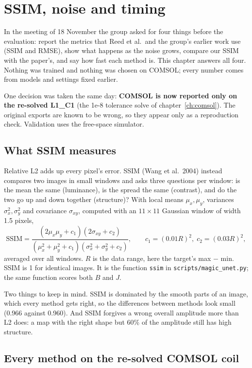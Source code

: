 \chapter{SSIM, noise and timing}\label{ch:noise}

In the meeting of 18 November the group asked for four things before the evaluation: report the metrics that Reed et
al.\ and the group's earlier work use (SSIM and RMSE), show what happens as the noise grows, compare our SSIM with
the paper's, and say how fast each method is. This chapter answers all four. Nothing was trained and nothing was
chosen on COMSOL; every number comes from models and settings fixed earlier.

One decision was taken the same day: \textbf{COMSOL is now reported only on the re-solved L1\_C1} (the 1e-8
tolerance solve of chapter~\ref{ch:comsol}). The original exports are known to be wrong, so they appear only as a
reproduction check. Validation uses the free-space simulator.

\section{What SSIM measures}

Relative L2 adds up every pixel's error. SSIM (Wang et al.\ 2004) instead compares two images in small windows and
asks three questions per window: is the mean the same (luminance), is the spread the same (contrast), and do the
two go up and down together (structure)? With local means $\mu_x,\mu_y$, variances $\sigma_x^2,\sigma_y^2$ and
covariance $\sigma_{xy}$, computed with an $11\times11$ Gaussian window of width 1.5 pixels,
\begin{equation}
\mathrm{SSIM} = \frac{(2\mu_x\mu_y + c_1)(2\sigma_{xy} + c_2)}{(\mu_x^2+\mu_y^2+c_1)(\sigma_x^2+\sigma_y^2+c_2)},
\qquad c_1 = (0.01R)^2,\; c_2 = (0.03R)^2 ,
\end{equation}
averaged over all windows. $R$ is the data range, here the target's max $-$ min. SSIM is 1 for identical images. It is
the function \texttt{ssim} in \texttt{scripts/magic\_unet.py}; the same function scores both $B$ and $J$.

Two things to keep in mind. SSIM is dominated by the smooth parts of an image, which every method gets right, so the
differences between methods look small (0.966 against 0.960). And SSIM forgives a wrong overall amplitude more than L2
does: a map with the right shape but 60\% of the amplitude still has high structure.

\section{Every method on the re-solved COMSOL coil}

